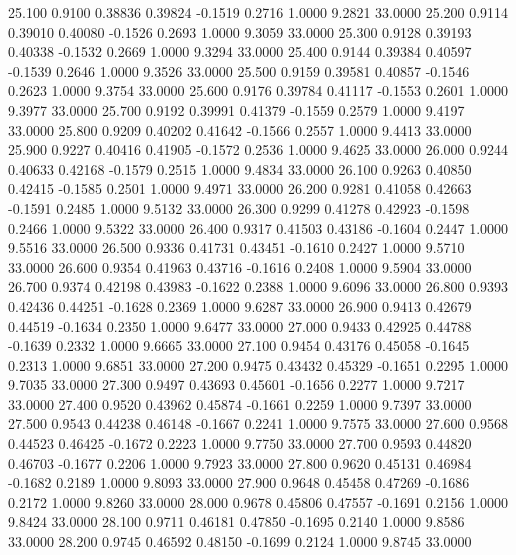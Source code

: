   25.100   0.9100   0.38836   0.39824  -0.1519   0.2716   1.0000   9.2821  33.0000
  25.200   0.9114   0.39010   0.40080  -0.1526   0.2693   1.0000   9.3059  33.0000
  25.300   0.9128   0.39193   0.40338  -0.1532   0.2669   1.0000   9.3294  33.0000
  25.400   0.9144   0.39384   0.40597  -0.1539   0.2646   1.0000   9.3526  33.0000
  25.500   0.9159   0.39581   0.40857  -0.1546   0.2623   1.0000   9.3754  33.0000
  25.600   0.9176   0.39784   0.41117  -0.1553   0.2601   1.0000   9.3977  33.0000
  25.700   0.9192   0.39991   0.41379  -0.1559   0.2579   1.0000   9.4197  33.0000
  25.800   0.9209   0.40202   0.41642  -0.1566   0.2557   1.0000   9.4413  33.0000
  25.900   0.9227   0.40416   0.41905  -0.1572   0.2536   1.0000   9.4625  33.0000
  26.000   0.9244   0.40633   0.42168  -0.1579   0.2515   1.0000   9.4834  33.0000
  26.100   0.9263   0.40850   0.42415  -0.1585   0.2501   1.0000   9.4971  33.0000
  26.200   0.9281   0.41058   0.42663  -0.1591   0.2485   1.0000   9.5132  33.0000
  26.300   0.9299   0.41278   0.42923  -0.1598   0.2466   1.0000   9.5322  33.0000
  26.400   0.9317   0.41503   0.43186  -0.1604   0.2447   1.0000   9.5516  33.0000
  26.500   0.9336   0.41731   0.43451  -0.1610   0.2427   1.0000   9.5710  33.0000
  26.600   0.9354   0.41963   0.43716  -0.1616   0.2408   1.0000   9.5904  33.0000
  26.700   0.9374   0.42198   0.43983  -0.1622   0.2388   1.0000   9.6096  33.0000
  26.800   0.9393   0.42436   0.44251  -0.1628   0.2369   1.0000   9.6287  33.0000
  26.900   0.9413   0.42679   0.44519  -0.1634   0.2350   1.0000   9.6477  33.0000
  27.000   0.9433   0.42925   0.44788  -0.1639   0.2332   1.0000   9.6665  33.0000
  27.100   0.9454   0.43176   0.45058  -0.1645   0.2313   1.0000   9.6851  33.0000
  27.200   0.9475   0.43432   0.45329  -0.1651   0.2295   1.0000   9.7035  33.0000
  27.300   0.9497   0.43693   0.45601  -0.1656   0.2277   1.0000   9.7217  33.0000
  27.400   0.9520   0.43962   0.45874  -0.1661   0.2259   1.0000   9.7397  33.0000
  27.500   0.9543   0.44238   0.46148  -0.1667   0.2241   1.0000   9.7575  33.0000
  27.600   0.9568   0.44523   0.46425  -0.1672   0.2223   1.0000   9.7750  33.0000
  27.700   0.9593   0.44820   0.46703  -0.1677   0.2206   1.0000   9.7923  33.0000
  27.800   0.9620   0.45131   0.46984  -0.1682   0.2189   1.0000   9.8093  33.0000
  27.900   0.9648   0.45458   0.47269  -0.1686   0.2172   1.0000   9.8260  33.0000
  28.000   0.9678   0.45806   0.47557  -0.1691   0.2156   1.0000   9.8424  33.0000
  28.100   0.9711   0.46181   0.47850  -0.1695   0.2140   1.0000   9.8586  33.0000
  28.200   0.9745   0.46592   0.48150  -0.1699   0.2124   1.0000   9.8745  33.0000

